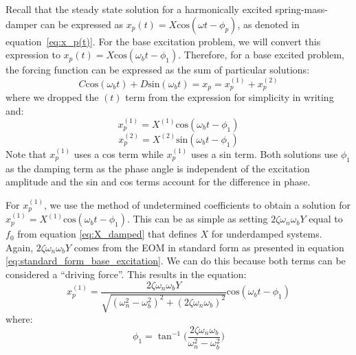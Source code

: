 \documentclass[12pt,letter]{article}
\numberwithin{ex}{section} %
\numberwithin{re}{section} %
\begin{document}
				 Recall that the steady state solution for a harmonically excited spring-mass-damper can be expressed as $x_p(t) = X\text{cos}(\omega t - \phi_p)$, as denoted in equation~\ref{eq:x_p(t)}. For the base excitation problem, we will convert this expression to $x_p(t) = X\text{cos}(\omega_b t - \phi_1)$. Therefore, for a base excited problem, the forcing function can be expressed as the sum of particular solutions:
				\begin{equation}
					C \text{cos}(\omega_b t)  + D \text{sin}(\omega_b t)   = x_p = 	x_p^{(1)} + 	x_p^{(2)} 
				\end{equation}
				where we dropped the $(t)$ term from the expression for simplicity in writing and:
				\begin{equation}
					x_p^{(1)} = X^{(1)}\text{cos}(\omega_b t - \phi_1)
				\end{equation}
				\begin{equation}
					x_p^{(2)} = X^{(2)} \text{sin}(\omega_b t - \phi_1)
				\end{equation}
				Note that $x_p^{(1)}$ uses a cos term while $x_p^{(1)}$ uses a sin term. Both solutions use $\phi_1$ as the damping term as the phase angle is independent of the excitation amplitude and the sin and cos terms account for the difference in phase. 
				
				For $x_p^{(1)}$, we use the method of undetermined coefficients to obtain a solution for $x_p^{(1)} = X^{(1)}\text{cos}(\omega_b t - \phi_1)$. This can be as simple as setting $2 \zeta \omega_n \omega_b Y$ equal to $f_0$ from equation \ref{eq:X_damped} that defines $X$ for underdamped systems. Again, $2 \zeta \omega_n \omega_b Y$  comes from the EOM in standard form as presented in equation 	
				\ref{eq:standard_form_base_excitation}. We can do this because both terms can be considered a ``driving force''. This results in the equation:
				\begin{equation}
					x_p^{(1)} = \frac{2 \zeta \omega_n \omega_b Y}{\sqrt{(\omega_n^2 - \omega_b^2)^2 +  (2\zeta \omega_n \omega_b)^2}}  \text{cos}(\omega_b t - \phi_1)
					\label{eq:xp_1}
				\end{equation}
				where:
				\begin{equation}
					\phi_1 = \tan^{-1} \bigg(\frac{2\zeta \omega_n \omega_b}{\omega_n^2 - \omega_b^2}\bigg)
				\end{equation}
				
\end{document}

